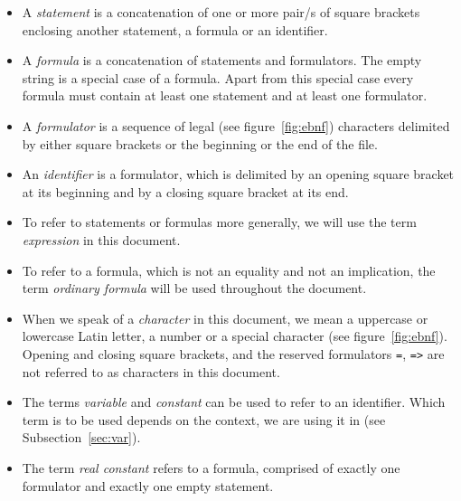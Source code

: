 \documentclass[british]{article}
\newcommand\prv{bc}
\newcommand\m[1]{\texttt{#1}}
\begin{document}
\textcolor{dartmouthgreen}{\begin{itemize}
	\item
		A \emph{statement} is a concatenation of one or more pair/s of square
		brackets enclosing another statement, a formula or an identifier.
	\item
		A \emph{formula} is a concatenation of statements and formulators.
		The empty string is a special case of a formula. Apart from this special
		case every formula must contain at least one statement and at least
		one formulator.
	\item
		A \emph{formulator} is a sequence of legal (see figure~\ref{fig:ebnf})
		characters delimited by either square brackets or the beginning or the
		end of the file.
	\item
		An \emph{identifier} is a formulator, which is delimited by an opening
		square bracket at its beginning and by a closing square bracket at its
		end.
	\item
		To refer to statements or formulas more generally, we will use the
		term \emph{expression }in this document.
	\item
		To refer to a formula, which is not an equality and not an implication,
		the term \emph{ordinary formula} will be used throughout the document.
	\item
		When we speak of a \emph{character} in this document, we mean a
		uppercase or lowercase Latin letter, a number or a special character
		(see figure~\ref{fig:ebnf}). Opening and closing square brackets, and
		the reserved formulators \m{=}, \m{=>} are not referred to as characters
		in this document.
	\item
		The terms \emph{variable} and \emph{constant} can be used to refer
		to an identifier. Which term is to be used depends on the context,
		we are using it in (see Subsection~\ref{sec:var}).
	\item
		The term \emph{real constant} refers to a formula, comprised of exactly
		one formulator and exactly one empty statement.
\end{itemize}}
\end{document}
